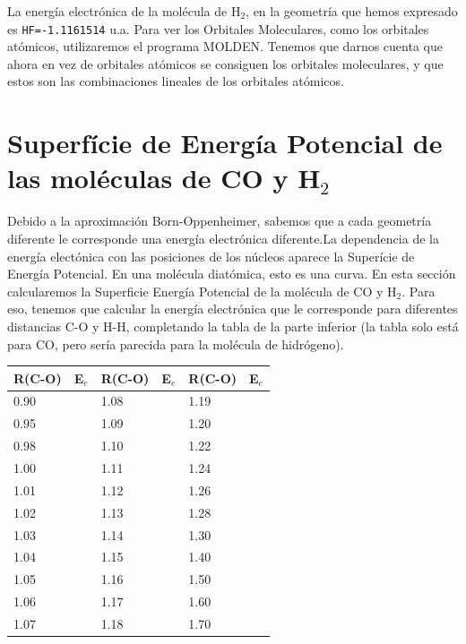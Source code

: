 \documentclass{tufte-book}
\begin{document}
La energía electrónica de la molécula de H$_2$, en la geometría que hemos expresado es \texttt{HF=-1.1161514} u.a. Para ver los Orbitales Moleculares, como los orbitales atómicos, utilizaremos el programa MOLDEN. Tenemos que darnos cuenta que ahora en vez de orbitales atómicos se consiguen los orbitales moleculares, y que estos son las combinaciones lineales de los orbitales atómicos.

\section{Superfície de Energía Potencial de las moléculas de CO y H$_2$}

Debido a la aproximación Born-Oppenheimer, sabemos que a cada geometría diferente le corresponde una energía electrónica diferente.La dependencia de la energía electónica con las posiciones de los núcleos aparece la Superície de Energía Potencial. En una molécula diatómica, esto es una curva. En esta sección calcularemos la Superficie Energía Potencial de la molécula de CO y H$_2$. Para eso, tenemos que calcular la energía electrónica que le corresponde para diferentes distancias C-O y H-H, completando la tabla de la parte inferior (la tabla solo está para CO, pero sería parecida para la molécula de hidrógeno).

\begin{table}[h!]
\centering
	\small
	\begin{tabular}{ll|ll|ll}
	\toprule
		R(C-O) & E$_e$ & R(C-O) & E$_e$ & R(C-O) & E$_e$ \\
		\hline
		0.90   &       & 1.08   &       & 1.19   &        \\
		0.95   &       & 1.09   &       & 1.20   &        \\
		0.98   &       & 1.10   &       & 1.22   &        \\
		1.00   &       & 1.11   &       & 1.24   &        \\
		1.01   &       & 1.12   &       & 1.26   &        \\
		1.02   &       & 1.13   &       & 1.28   &        \\
		1.03   &       & 1.14   &       & 1.30   &        \\
		1.04   &       & 1.15   &       & 1.40   &        \\
		1.05   &       & 1.16   &       & 1.50   &        \\
		1.06   &       & 1.17   &       & 1.60   &        \\
		1.07   &       & 1.18   &       & 1.70   &        \\
	\bottomrule	
    \end{tabular}
\end{table}
\end{document}
